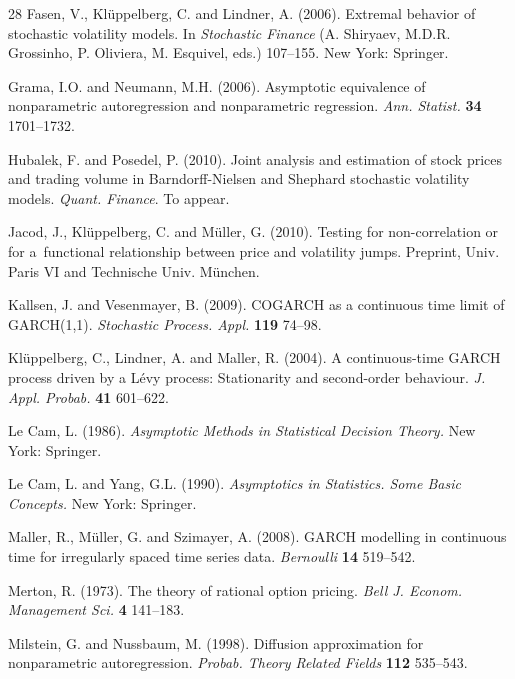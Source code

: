 \documentclass[number,citesort,seceqn,dvips]{arxbj}
\begin{document}
\begin{thebibliography}{28}
Fasen, V., Kl\"{u}ppelberg, C. and Lindner, A. (2006). Extremal
behavior of stochastic volatility models. In \textit{Stochastic
Finance} (A. Shiryaev,
M.D.R. Grossinho, P. Oliviera, M. Esquivel, eds.) 107--155. New York:
Springer.

Grama, I.O. and Neumann, M.H. (2006). Asymptotic equivalence
of nonparametric autoregression and nonparametric regression.
\textit{Ann. Statist.} \textbf{34} 1701--1732.

Hubalek, F. and Posedel, P. (2010).
Joint analysis and estimation of stock prices and trading volume
in Barndorff-Nielsen and Shephard stochastic volatility models.
\textit{Quant. Finance}. To appear.

Jacod, J., Kl\"{u}ppelberg, C. and M\"{u}ller, G. (2010).
Testing for non-correlation or for a~functional relationship
between price and volatility jumps.
Preprint, Univ. Paris VI and Technische Univ. M\"{u}nchen.

Kallsen, J. and Vesenmayer, B. (2009). COGARCH as a
continuous time limit of GARCH(1,1). \textit{Stochastic
Process. Appl.} \textbf{119} 74--98.

Kl{\"{u}}ppelberg, C., Lindner, A. and Maller,
R. (2004). A continuous-time {GARCH} process driven by a {L}\'{e}vy
process: Stationarity and second-order behaviour. \textit{J. Appl.
Probab.} \textbf{41} 601--622.

Le Cam, L. (1986). \textit{Asymptotic Methods in Statistical
Decision Theory.} New York: Springer.

Le Cam, L. and Yang, G.L. (1990). \textit{Asymptotics in
Statistics. Some Basic Concepts.} New York: Springer.

Maller, R., M\"{u}ller, G. and Szimayer, A. (2008). GARCH
modelling in continuous time for irregularly spaced time series data.
\textit{Bernoulli} \textbf{14} 519--542.

Merton, R. (1973). The theory of rational option pricing.
\textit{Bell J. Econom. Management Sci.} \textbf{4} 141--183.

Milstein, G. and Nussbaum, M. (1998). Diffusion
approximation for nonparametric autoregression. \textit{Probab. Theory
Related Fields} \textbf{112} 535--543.


\end{thebibliography}
\end{document}
